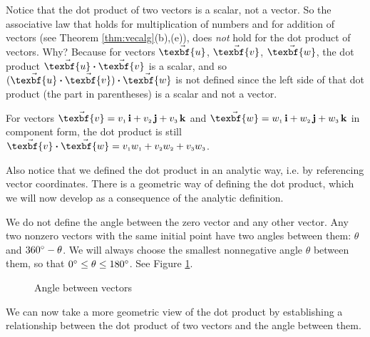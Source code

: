 Notice that the dot product of two vectors is a scalar, not a vector. 
So the associative law that holds for multiplication of numbers and for addition of vectors (see
Theorem \ref{thm:vecalg}(b),(e)), does \emph{not} hold for the dot product of vectors. Why? Because for vectors
$\vec{\texbf{u}}$, $\vec{\texbf{v}}$, $\vec{\texbf{w}}$, the dot product $\Dotprod{\vec{\texbf{u}}}{\vec{\texbf{v}}}$ is a scalar, and so
$\Dotprod{(\Dotprod{\vec{\texbf{u}}}{\vec{\texbf{v}}})}{\vec{\texbf{w}}}$ is not defined since the left side of that dot product
(the part in parentheses) is a scalar and not a vector.

For vectors $\vec{\texbf{v}} = \vecthreeijk{v}$ and $\vec{\texbf{w}} = \vecthreeijk{w}$ in component form, the dot product is
still $\Dotprod{\vec{\texbf{v}}}{\vec{\texbf{w}}} = \ssub{v}{1}\ssub{w}{1} + \ssub{v}{2}\ssub{w}{2} +
\ssub{v}{3}\ssub{w}{3}$.

Also notice that we defined the dot product in an analytic way, i.e. by referencing vector coordinates. There is
a geometric way of defining the dot product, which we will now develop as a consequence of the analytic
definition.


We do not define the angle between the zero vector and any other vector.
Any two nonzero vectors with the same initial point have two angles between them: $\theta$ and $360^\circ - \theta$.
We will always choose the smallest nonnegative angle $\theta$ between them, so that $0^\circ \leq \theta \leq
180^\circ$. See Figure \ref{fig:angle}.

\begin{figure}[h]
 \centering
 \qquad
 \qquad
 \caption[]{\quad Angle between vectors}
 \label{fig:angle}
\end{figure}

We can now take a more geometric view of
the dot product by establishing a relationship between the dot product of two vectors and the angle between them.

